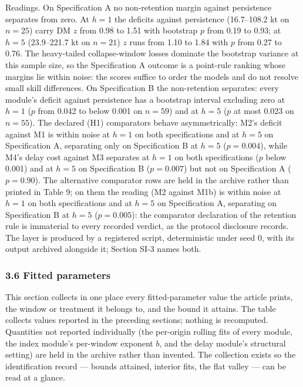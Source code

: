 \documentclass[11pt]{article}
\begin{document}
Readings. On Specification A no non-retention margin against persistence separates
from zero. At \(h=1\) the deficits against persistence (16.7--108.2 kt
on \(n=25\)) carry DM \(z\) from 0.98 to 1.51 with bootstrap \(p\) from
0.19 to 0.93; at \(h=5\) (23.9--221.7 kt on \(n=21\)) \(z\) runs from
1.10 to 1.84 with \(p\) from 0.27 to 0.76. The heavy-tailed
collapse-window losses dominate the bootstrap variance at this sample
size, so the Specification A outcome is a point-rule ranking whose
margins lie within noise: the scores suffice to order the models and do
not resolve small skill differences. On Specification B the non-retention
separates: every module's deficit against persistence has a bootstrap interval excluding zero at
\(h=1\) (\(p\) from 0.042 to below 0.001 on \(n=59\)) and at \(h=5\)
(\(p\) at most 0.023 on \(n=55\)). The declared (H1) comparators behave
asymmetrically: M2's deficit against M1 is within noise at \(h=1\) on
both specifications and at \(h=5\) on Specification A, separating only
on Specification B at \(h=5\) (\(p=0.004\)), while M4's delay cost
against M3 separates at \(h=1\) on both specifications (\(p\) below
0.001) and at \(h=5\) on Specification B (\(p=0.007\)) but not on
Specification A (\(p=0.90\)). The alternative comparator rows are held in the
archive rather than printed in Table 9; on them the reading (M2
against M1b) is within noise at \(h=1\) on both specifications and at
\(h=5\) on Specification A, separating on Specification B at \(h=5\)
(\(p=0.005\)): the comparator declaration of the retention rule is
immaterial to every recorded verdict, as the protocol disclosure
records. The layer is produced by a registered script, deterministic under seed 0,
with its output archived alongside it; Section SI-3 names both.

\subsubsection{3.6 Fitted parameters}\label{fitted-parameters}

This section collects in one place every fitted-parameter value the
article prints, the window or treatment it belongs to, and the bound it
attains. The table collects values reported in the preceding
sections; nothing is recomputed. Quantities not reported individually
(the per-origin rolling fits of every module, the index module's
per-window exponent \(b\), and the delay module's structural setting)
are held in the archive rather than
invented. The collection exists so the identification record --- bounds
attained, interior fits, the flat valley --- can be read at a glance.
\end{document}
